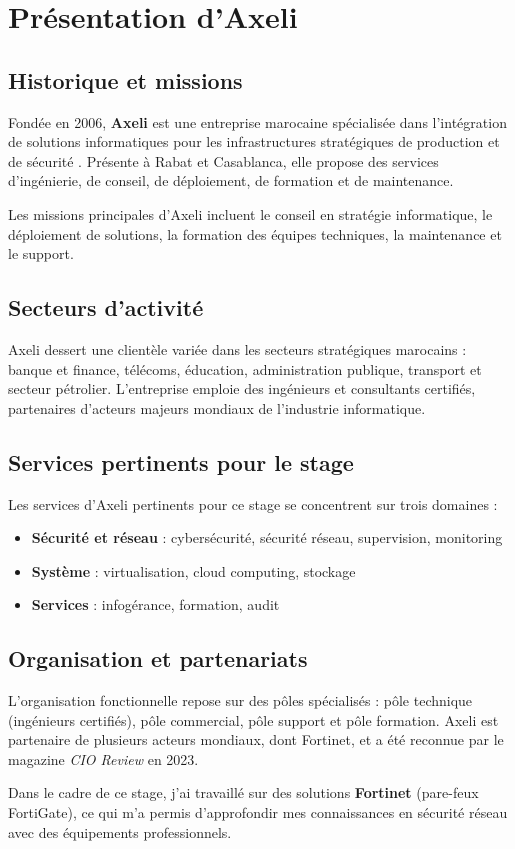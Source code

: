 \chapter{Présentation d'Axeli}
\label{chap:axeli}

\section{Historique et missions}

Fondée en 2006, \textbf{Axeli} est une entreprise marocaine spécialisée dans l'intégration de solutions informatiques pour les infrastructures stratégiques de production et de sécurité \cite{11}. Présente à Rabat et Casablanca, elle propose des services d'ingénierie, de conseil, de déploiement, de formation et de maintenance.

Les missions principales d'Axeli incluent le conseil en stratégie informatique, le déploiement de solutions, la formation des équipes techniques, la maintenance et le support.

\section{Secteurs d'activité}

Axeli dessert une clientèle variée dans les secteurs stratégiques marocains : banque et finance, télécoms, éducation, administration publique, transport et secteur pétrolier. L'entreprise emploie des ingénieurs et consultants certifiés, partenaires d'acteurs majeurs mondiaux de l'industrie informatique.

\section{Services pertinents pour le stage}

Les services d'Axeli pertinents pour ce stage se concentrent sur trois domaines \cite{11} :

\begin{itemize}
    \item \textbf{Sécurité et réseau} : cybersécurité, sécurité réseau, supervision, monitoring
    \item \textbf{Système} : virtualisation, cloud computing, stockage
    \item \textbf{Services} : infogérance, formation, audit
\end{itemize}

\section{Organisation et partenariats}

L'organisation fonctionnelle repose sur des pôles spécialisés : pôle technique (ingénieurs certifiés), pôle commercial, pôle support et pôle formation. Axeli est partenaire de plusieurs acteurs mondiaux, dont Fortinet, et a été reconnue par le magazine \textit{CIO Review} en 2023.

Dans le cadre de ce stage, j'ai travaillé sur des solutions \textbf{Fortinet} (pare-feux FortiGate), ce qui m'a permis d'approfondir mes connaissances en sécurité réseau avec des équipements professionnels.
